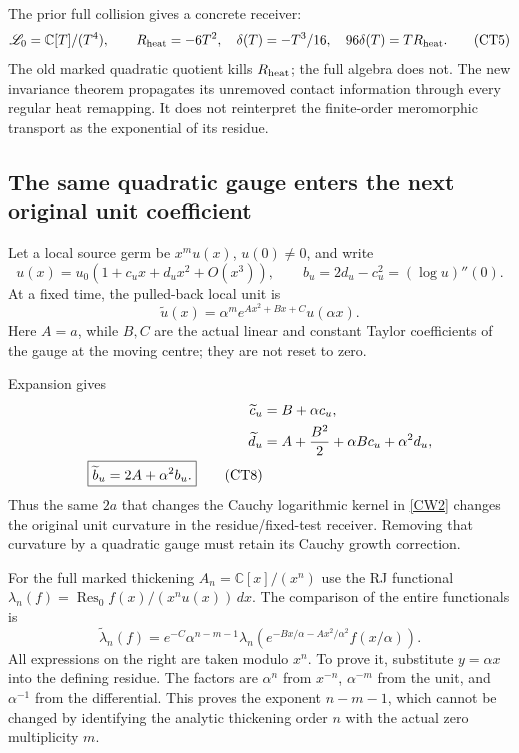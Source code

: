 \documentclass[11pt,a4paper]{article}
\theoremstyle{definition}\newtheorem{definition}[theorem]{Definition}
\newcommand{\C}{\mathbb C}\newcommand{\R}{\mathbb R}\newcommand{\N}{\mathbb N}
\newcommand{\Res}{\operatorname{Res}}\newcommand{\amp}{\operatorname{amp}}
\begin{document}
The prior full collision \cite{Prior} gives a concrete receiver:
\begin{equation}
 \mathscr L_0=\C[T]/(T^4),\qquad
 R_{\rm heat}=-6T^2,\quad\delta(T)=-T^3/16,\quad
 96\delta(T)=T R_{\rm heat}.                                \tag{CT5}\label{CT5}
\end{equation}
The old marked quadratic quotient kills $R_{\rm heat}$; the full algebra does not. The new invariance theorem propagates its unremoved contact information through every regular heat remapping. It does not reinterpret the finite-order meromorphic transport as the exponential of its residue.

\subsection{The same quadratic gauge enters the next original unit coefficient}
Let a local source germ be $x^m u(x)$, $u(0)\ne0$, and write
\begin{equation}
 u(x)=u_0(1+c_u x+d_u x^2+O(x^3)),\qquad
 b_u=2d_u-c_u^2=(\log u)''(0).                               \tag{CT6}\label{CT6}
\end{equation}
At a fixed time, the pulled-back local unit is
\begin{equation}
 \widetilde u(x)=\alpha^m e^{Ax^2+Bx+C}u(\alpha x).
                                                               \tag{CT7}\label{CT7}
\end{equation}
Here $A=a$, while $B,C$ are the actual linear and constant Taylor coefficients of the gauge at the moving centre; they are not reset to zero.

Expansion gives
\begin{align}
 \widetilde c_u&=B+\alpha c_u,\notag\\
 \widetilde d_u&=A+\frac{B^2}{2}+\alpha Bc_u+\alpha^2d_u,\notag\\
 \boxed{\widetilde b_u=2A+\alpha^2b_u.}                       \tag{CT8}\label{CT8}
\end{align}
Thus the same $2a$ that changes the Cauchy logarithmic kernel in \eqref{CW2} changes the original unit curvature in the residue/fixed-test receiver. Removing that curvature by a quadratic gauge must retain its Cauchy growth correction.

For the full marked thickening $A_n=\C[x]/(x^n)$ use the RJ functional
$\lambda_n(f)=\Res_0 f(x)/(x^n u(x))\,dx$.
The comparison of the entire functionals is
\begin{equation}
 \boxed{\widetilde\lambda_n(f)
 =e^{-C}\alpha^{n-m-1}\lambda_n\!
 \left(e^{-Bx/\alpha-Ax^2/\alpha^2}f(x/\alpha)\right).}
                                                               \tag{CT9}\label{CT9}
\end{equation}
All expressions on the right are taken modulo $x^n$. To prove it, substitute $y=\alpha x$ into the defining residue. The factors are $\alpha^n$ from $x^{-n}$, $\alpha^{-m}$ from the unit, and $\alpha^{-1}$ from the differential. This proves the exponent $n-m-1$, which cannot be changed by identifying the analytic thickening order $n$ with the actual zero multiplicity $m$.
\end{document}
